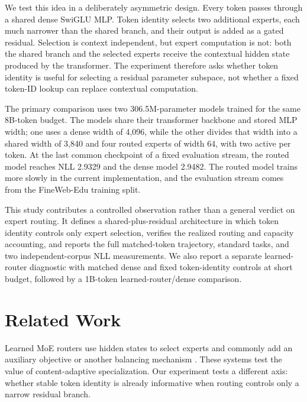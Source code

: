 \documentclass[10pt]{article}
\theoremstyle{definition}
\theoremstyle{remark}
\begin{document}
We test this idea in a deliberately asymmetric design. Every token passes through a shared dense SwiGLU MLP. Token identity selects two additional experts, each much narrower than the shared branch, and their output is added as a gated residual. Selection is context independent, but expert computation is not: both the shared branch and the selected experts receive the contextual hidden state produced by the transformer. The experiment therefore asks whether token identity is useful for selecting a residual parameter subspace, not whether a fixed token-ID lookup can replace contextual computation.

The primary comparison uses two 306.5M-parameter models trained for the same 8B-token budget. The models share their transformer backbone and stored MLP width; one uses a dense width of 4,096, while the other divides that width into a shared width of 3,840 and four routed experts of width 64, with two active per token. At the last common checkpoint of a fixed evaluation stream, the routed model reaches NLL 2.9329 and the dense model 2.9482. The routed model trains more slowly in the current implementation, and the evaluation stream comes from the FineWeb-Edu training split.

This study contributes a controlled observation rather than a general verdict on expert routing. It defines a shared-plus-residual architecture in which token identity controls only expert selection, verifies the realized routing and capacity accounting, and reports the full matched-token trajectory, standard tasks, and two independent-corpus NLL measurements. We also report a separate learned-router diagnostic with matched dense and fixed token-identity controls at short budget, followed by a 1B-token learned-router/dense comparison.

\section{Related Work}
\label{sec:related_work}

Learned MoE routers use hidden states to select experts and commonly add an auxiliary objective or another balancing mechanism \citep{shazeer2017outrageously,fedus2022switch,jiang2024mixtral}. These systems test the value of content-adaptive specialization. Our experiment tests a different axis: whether stable token identity is already informative when routing controls only a narrow residual branch.
\end{document}
